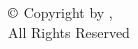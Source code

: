 \label{chap:copyright}

\thispagestyle{empty} %
\begin{center}
  \begin{singlespace}
    \null %
    \vfill
    $\copyright$ Copyright by \MakeUppercase{\myname}, \currentyear\\
    All Rights Reserved
  \end{singlespace}
\end{center}
\newpage
